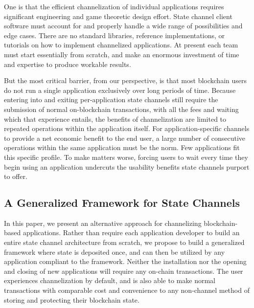 \documentclass[prb,floatfix,reprint,nofootinbib,amsmath,amssymb,epsfig,pre,floats,letterpaper,groupedaffiliation,tightenlines,allcolors=blue,11pt]{revtex4}
\theoremstyle{definition}
\theoremstyle{definition}
\theoremstyle{definition}
\begin{document}
One is that the efficient channelization of individual applications requires significant engineering and game theoretic design effort. State channel client software must account for and properly handle a wide range of possibilities and edge cases.  There are no standard libraries, reference implementations, or tutorials on how to implement channelized applications. At present each team must start essentially from scratch, and make an enormous investment of time and expertise to produce workable results.

But the most critical barrier, from our perspective, is that most blockchain users do not run a single application exclusively over long periods of time.  Because entering into and exiting per-application state channels still require the submission of normal on-blockchain transactions, with all the fees and waiting which that experience entails, the benefits of channelization are limited to repeated operations within the application itself.  For application-specific channels to provide a net economic benefit to the end user, a large number of consecutive operations within the same application must be the norm.  Few applications fit this specific profile.  To make matters worse, forcing users to wait every time they begin using an application undercuts the usability benefits state channels purport to offer.

\subsection{A Generalized Framework for State Channels}

In this paper, we present an alternative approach for channelizing blockchain-based applications.  Rather than require each application developer to build an entire state channel architecture from scratch, we propose to build a generalized framework where state is deposited once, and can then be utilized by any application compliant to the framework. Neither the installation nor the opening and closing of new applications will require any on-chain transactions. The user experiences channelization by default, and is also able to make normal transactions with comparable cost and convenience to any non-channel method of storing and protecting their blockchain state.
\end{document}
